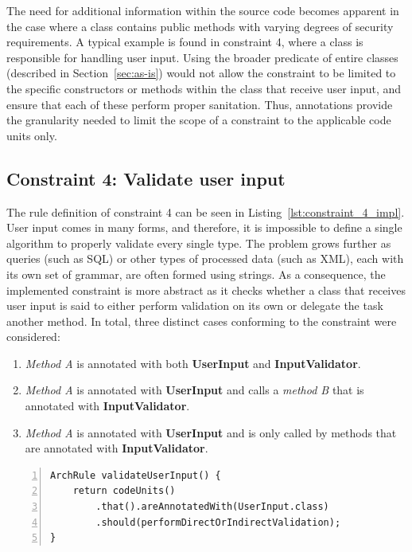 The need for additional information within the source code becomes apparent in the case where a class contains public methods with varying degrees of security requirements. A typical example is found in constraint 4, where a class is responsible for handling user input. Using the broader predicate of entire classes (described in Section~\ref{sec:as-is}) would not allow the constraint to be limited to the specific constructors or methods within the class that receive user input, and ensure that each of these perform proper sanitation. Thus, annotations provide the granularity needed to limit the scope of a constraint to the applicable code units only.

\subsection{Constraint 4: Validate user input}
The rule definition of constraint 4 can be seen in Listing~\ref{lst:constraint_4_impl}.
User input comes in many forms, and therefore, it is impossible to define a single algorithm to properly validate every single type. The problem grows further as queries (such as SQL) or other types of processed data (such as XML), each with its own set of grammar, are often formed using strings. As a consequence, the implemented constraint is more abstract as it checks whether a class that receives user input is said to either perform validation on its own or delegate the task another method. In total, three distinct cases conforming to the constraint were considered: 

\begin{enumerate}
    \item \textit{Method A} is annotated with both \textbf{UserInput} and \textbf{InputValidator}.
    
    \item \textit{Method A} is annotated with \textbf{UserInput} and calls a \textit{method B} that is annotated with \textbf{InputValidator}.
    
    \item \textit{Method A} is annotated with \textbf{UserInput} and is only called by methods that are annotated with \textbf{InputValidator}.
\end{enumerate}

\begin{minipage}{\linewidth}
\begin{lstlisting}[caption={Rule definition for constraint 4.}, captionpos=b, label=lst:constraint_4_impl, numbers=left]
ArchRule validateUserInput() {
    return codeUnits()
        .that().areAnnotatedWith(UserInput.class)
        .should(performDirectOrIndirectValidation);
}
\end{lstlisting}
\end{minipage}

